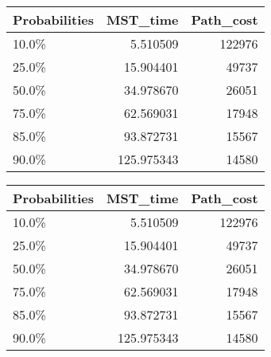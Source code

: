 \begin{tabular}{lrr}
\toprule
Probabilities &    MST\_time &  Path\_cost \\
\midrule
        10.0\% &    5.510509 &     122976 \\
        25.0\% &   15.904401 &      49737 \\
        50.0\% &   34.978670 &      26051 \\
        75.0\% &   62.569031 &      17948 \\
        85.0\% &   93.872731 &      15567 \\
        90.0\% &  125.975343 &      14580 \\
\bottomrule
\end{tabular}
\begin{tabular}{|l|r|r|}
\toprule \hline
Probabilities &    MST\_time &  Path\_cost \\ \hline

\midrule
        10.0\% &    5.510509 &     122976 \\ \hline

        25.0\% &   15.904401 &      49737 \\ \hline

        50.0\% &   34.978670 &      26051 \\ \hline

        75.0\% &   62.569031 &      17948 \\ \hline

        85.0\% &   93.872731 &      15567 \\ \hline

        90.0\% &  125.975343 &      14580 \\ \hline

\bottomrule
\end{tabular}
